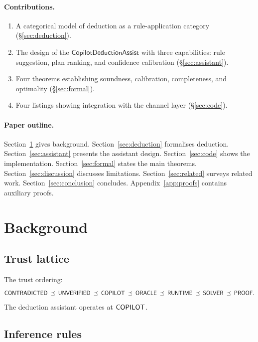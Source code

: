 \documentclass[11pt]{article}
\newcommand{\CDA}{\mathsf{CopilotDeductionAssist}}
\begin{document}
\paragraph{Contributions.}
\begin{enumerate}
\item A categorical model of deduction as a rule-application
      category (\S\ref{sec:deduction}).
\item The design of the $\CDA$ with three capabilities:
      rule suggestion, plan ranking, and confidence
      calibration (\S\ref{sec:assistant}).
\item Four theorems establishing soundness, calibration,
      completeness, and optimality (\S\ref{sec:formal}).
\item Four \Python{} listings showing integration with
      the channel layer (\S\ref{sec:code}).
\end{enumerate}

\paragraph{Paper outline.}
Section~\ref{sec:background} gives background.
Section~\ref{sec:deduction} formalises deduction.
Section~\ref{sec:assistant} presents the assistant design.
Section~\ref{sec:code} shows the implementation.
Section~\ref{sec:formal} states the main theorems.
Section~\ref{sec:discussion} discusses limitations.
Section~\ref{sec:related} surveys related work.
Section~\ref{sec:conclusion} concludes.
Appendix~\ref{app:proofs} contains auxiliary proofs.

\section{Background}\label{sec:background}

\subsection{Trust lattice}

The trust ordering:
\[
  \mathsf{CONTRADICTED} \;\preceq\; \mathsf{UNVERIFIED} \;\preceq\; \mathsf{COPILOT}
  \;\preceq\; \mathsf{ORACLE} \;\preceq\; \mathsf{RUNTIME}
  \;\preceq\; \mathsf{SOLVER} \;\preceq\; \mathsf{PROOF}.
\]
The deduction assistant operates at $\mathsf{COPILOT}$.

\subsection{Inference rules}
\end{document}
